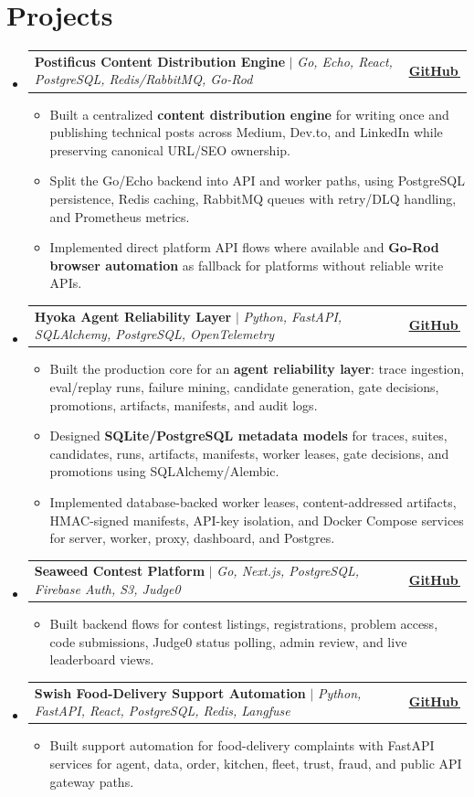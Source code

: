 \documentclass[letterpaper,11pt]{article}
\makeatletter
\newcommand{\bodyhref}[2]{\href{#1}{\underline{#2}\,\faExternalLink*}}
\newcommand{\resumeItem}[1]{\item{\fontsize{8.82pt}{9.28pt}\selectfont #1\vspace{-0.7pt}}}
\newcommand{\resumeProjectHeading}[2]{
    \item
    \begin{tabular*}{1.0\textwidth}{l@{\extracolsep{\fill}}r}
      \small#1 & \textbf{\small #2}\\
    \end{tabular*}\vspace{-4pt}
}
\newcommand{\resumeSubHeadingListStart}{\begin{itemize}[leftmargin=0.0in, label={}, itemsep=0.6pt, topsep=0pt, parsep=0pt, partopsep=0pt]}
\newcommand{\resumeSubHeadingListEnd}{\end{itemize}}
\newcommand{\resumeItemListStart}{\begin{itemize}[leftmargin=0.16in,itemsep=0.3pt,topsep=0.9pt,parsep=0pt,partopsep=0pt]}
\newcommand{\resumeItemListEnd}{\end{itemize}\vspace{-3pt}}
\makeatother
\begin{document}
\section{Projects}
\resumeSubHeadingListStart
\resumeProjectHeading
{\textbf{Postificus Content Distribution Engine} $|$ \emph{Go, Echo, React, PostgreSQL, Redis/RabbitMQ, Go-Rod}}{\bodyhref{https://github.com/unichronic/postificus}{GitHub}}
\resumeItemListStart
\resumeItem{Built a centralized \textbf{content distribution engine} for writing once and publishing technical posts across Medium, Dev.to, and LinkedIn while preserving canonical URL/SEO ownership.}
\resumeItem{Split the Go/Echo backend into API and worker paths, using PostgreSQL persistence, Redis caching, RabbitMQ queues with retry/DLQ handling, and Prometheus metrics.}
\resumeItem{Implemented direct platform API flows where available and \textbf{Go-Rod browser automation} as fallback for platforms without reliable write APIs.}
\resumeItemListEnd
\resumeProjectHeading
{\textbf{Hyoka Agent Reliability Layer} $|$ \emph{Python, FastAPI, SQLAlchemy, PostgreSQL, OpenTelemetry}}{\bodyhref{https://github.com/unichronic/hyoka}{GitHub}}
\resumeItemListStart
\resumeItem{Built the production core for an \textbf{agent reliability layer}: trace ingestion, eval/replay runs, failure mining, candidate generation, gate decisions, promotions, artifacts, manifests, and audit logs.}
\resumeItem{Designed \textbf{SQLite/PostgreSQL metadata models} for traces, suites, candidates, runs, artifacts, manifests, worker leases, gate decisions, and promotions using SQLAlchemy/Alembic.}
\resumeItem{Implemented database-backed worker leases, content-addressed artifacts, HMAC-signed manifests, API-key isolation, and Docker Compose services for server, worker, proxy, dashboard, and Postgres.}
\resumeItemListEnd
\resumeProjectHeading
{\textbf{Seaweed Contest Platform} $|$ \emph{Go, Next.js, PostgreSQL, Firebase Auth, S3, Judge0}}{\bodyhref{https://github.com/unichronic/seaweed-fe}{GitHub}}
\resumeItemListStart
\resumeItem{Built backend flows for contest listings, registrations, problem access, code submissions, Judge0 status polling, admin review, and live leaderboard views.}
\resumeItemListEnd
\resumeProjectHeading
{\textbf{Swish Food-Delivery Support Automation} $|$ \emph{Python, FastAPI, React, PostgreSQL, Redis, Langfuse}}{\bodyhref{https://github.com/unichronic/swishagent}{GitHub}}
\resumeItemListStart
\resumeItem{Built support automation for food-delivery complaints with FastAPI services for agent, data, order, kitchen, fleet, trust, fraud, and public API gateway paths.}
\resumeItemListEnd
\resumeSubHeadingListEnd
\end{document}
